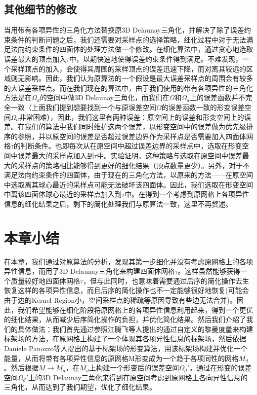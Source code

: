 \subsection{其他细节的修改}
当用带有各项异性的三角化方法替换原3D Delaunay三角化，并解决了除了误差约束条件的判断问题之后，我们还需要对采样点的选择策略，细化过程中对于无法满足法向约束条件的四面体的处理方法做一个修改。在细化算法中，通过贪心地选取误差最大的顶点加入$\tau$中，以期快速地使得误差约束条件得到满足。不难发现，一个采样顶点的加入，会使得其周围的采样顶点的误差迅速下降，而对离其较远的区域则无影响。因此，我们认为原算法的一个假设是最大误差采样点的周围会有较多的大误差采样点。而在我们现在的算法中，由于我们使用的带有各项异性的三角化方法是在$\Omega_d$的空间中做3D Delaunay三角化，而我们在$\Omega$和$\Omega_d$上的误差函数并不完全一致（上面我们提到想要找到一个与原误差空间$\Omega$的误差函数一致的形变误差空间$\Omega_d$非常困难），因此，我们这里有两种误差：原空间上的误差和形变空间上的误差。在我们的算法中我们同时维护这两个误差，以形变空间中的误差做为优先级排序的参照，并以原空间的误差是否超过误差边界作为采样点是否需要加入四面体网格τ的判断条件。也即每次从在原空间中超过误差边界的采样点中，选取在形变空间中误差最大的采样点加入到$\tau$中。实验证明，这种策略与选取在原空间中误差最大的采样点的策略相比能够得到更好的细化结果（顶点数量更少）。另外，对于不满足法向约束条件的四面体，由于现在的三角化方法，以原来的方法——在原空间中选取离其球心最近的采样点可能无法破坏该四面体。因此，我们选取在形变空间中离该四面体球心最近的采样点加入到$\tau$中。在得到一个考虑到原网格上各项异性信息的细化结果之后，剩下的简化处理我们与原算法一致，这里不再赘述。

\section{本章小结}
在本章，我们通过对原算法的分析，发现其第一步细化并没有考虑原网格上的各项异性信息，而用了3D Delaunay三角化来构建四面体网格$\tau$。这样虽然能够获得一个质量较好地四面体网格$\tau$，但与此同时，也意味着需要通过后序的简化操作去生恢复这样的各项异性信息，而且后序的简化操作也不一定能够很好地恢复(可能会由于边的Kernel Region小，空间采样点的稀疏等原因导致有些边无法合并)。因此，我们希望能够在细化阶段将原网格上的各项异性信息利用起来，得到一个更优的细化结果，从而减少后序简化操作的负担，并优化简化结果。然后我们介绍了我们的具体做法：我们首先通过参照江腾飞等人提出的通过自定义的黎曼度量来构建标架场的方法\cite{frame-field-gen}，在原网格上构建了一个体现其各项异性信息的标架场，然后依据Daniele Panozzo等人提出的基于标架场的形变算法\cite{frame-field-warping}，用该标架场构建并优化一个能量，从而将带有各项异性信息的原网格M形变成为一个趋于各项同性的网格$M_d$。然后根据$M \to M_d$，在$M_d$上构建一个形变后的误差空间$Ω_d'$。通过在形变的误差空间$Ω_d'$上的3D Delaunay三角化来得到在原空间考虑到原网格上各向异性信息的三角化，从而达到了我们期望，优化了细化结果。
